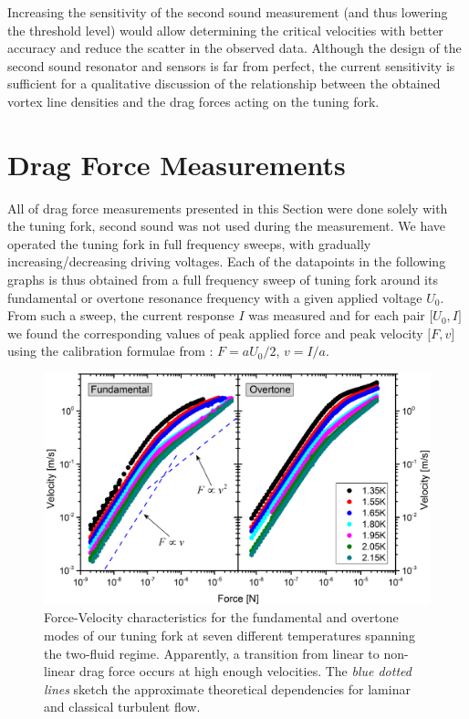 Increasing the sensitivity of the second sound measurement (and thus lowering the threshold level) would allow determining the critical velocities with better accuracy and reduce the scatter in the observed data. Although the design of the second sound resonator and sensors is far from perfect, the current sensitivity is sufficient for a qualitative discussion of the relationship between the obtained vortex line densities and the drag forces acting on the tuning fork.


\newpage

\section{Drag Force Measurements}

All of drag force measurements presented in this Section were done solely with the tuning fork, second sound was not used during the measurement. We have operated the tuning fork in full frequency sweeps, with gradually increasing/decreasing driving voltages. Each of the datapoints in the following graphs is thus obtained from a full frequency sweep of tuning fork around its fundamental or overtone resonance frequency with a given applied voltage $ U_0 $. From such a sweep, the current response $ I $ was measured and for each pair $ \big[U_0,I\big] $ we found the corresponding values of peak applied force and peak velocity $ \big[F,v\big] $ using the calibration formulae from \cite{forks}: $ F = a U_0/2 $, $ v = I/a $.

\begin{figure}[h!]
	\centering
	\includegraphics[width=1\textwidth]{graphs/Merged_v_F}
	\caption{Force-Velocity characteristics for the fundamental and overtone modes of our tuning fork at seven different temperatures spanning the two-fluid regime. Apparently, a transition from linear to non-linear drag force occurs at high enough velocities. The \textit{blue dotted lines} sketch the approximate theoretical dependencies for laminar and classical turbulent flow.}
\end{figure}

